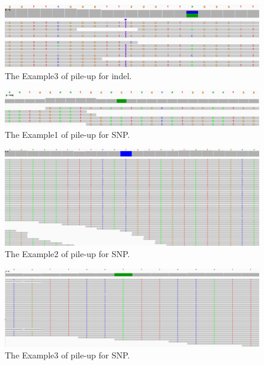 \documentclass[PhD]{PHlab-thesis}
\begin{document}
\begin{figure}[h!]
	\centering
	\includegraphics[scale=0.3]{figures/INDEL3.png}
	\caption{The Example3 of pile-up for indel.}
	\label{fig:The Example of pile-up for indel3} %
\end{figure}

\begin{figure}[h!]
	\centering
	\includegraphics[scale=0.3]{figures/SNP3.png}
	\caption{The Example1 of pile-up for SNP.}
	\label{fig:The Example of pile-up for SNP1} %
\end{figure}

\begin{figure}[h!]
	\centering
	\includegraphics[scale=0.25]{figures/SNP2.png}
	\caption{The Example2 of pile-up for SNP.}
	\label{fig:The Example of pile-up for SNP2} %
\end{figure}

\begin{figure}[h!]
	\centering
	\includegraphics[scale=0.25]{figures/SNP1.png}
	\caption{The Example3 of pile-up for SNP.}
	\label{fig:The Example of pile-up for SNP3} %
\end{figure}
\end{document}
